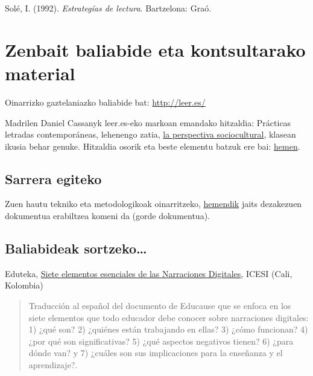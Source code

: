 \documentclass[
]{book}
\begin{document}
Solé, I. (1992). \emph{Estrategías de lectura}. Bartzelona: Graó.

\hypertarget{zenbait-baliabide-eta-kontsultarako-material}{%
\chapter*{Zenbait baliabide eta kontsultarako material}\label{zenbait-baliabide-eta-kontsultarako-material}}

Oinarrizko gaztelaniazko baliabide bat: \url{http://leer.es/}

Madrilen Daniel Cassanyk leer.es-eko markoan emandako hitzaldia: Prácticas letradas contemporáneas, lehenengo zatia, \href{https://www.youtube.com/embed/lsHc3SWiWEQ}{la perspectiva sociocultural}, klasean ikusia behar genuke. Hitzaldia osorik eta beste elementu batzuk ere bai: \href{http://www.youtube.com/watch?v=lsHc3SWiWEQ\&list=PLB91A13AEFDB0D9B0\&index=3}{hemen}.

\hypertarget{sarrera-egiteko}{%
\section{Sarrera egiteko}\label{sarrera-egiteko}}

Zuen hautu tekniko eta metodologikoak oinarritzeko, \href{https://github.com/JuanAbasolo/HD/raw/03-gaia/05_hizkuntzen_irakaskuntzarako_metodoak.pdf}{hemendik} jaits dezakezuen dokumentua erabiltzea komeni da (gorde dokumentua).

\hypertarget{baliabideak-sortzeko}{%
\section{Baliabideak sortzeko\ldots{}}\label{baliabideak-sortzeko}}

Eduteka, \href{http://eduteka.icesi.edu.co/articulos/NarracionesDigitales_Educause}{Siete elementos esenciales de las Narraciones Digitales}, ICESI (Cali, Kolombia)

\begin{quote}
Traducción al español del documento de Educause que se enfoca en los
siete elementos que todo educador debe conocer sobre narraciones
digitales: 1) ¿qué son? 2) ¿quiénes están trabajando en ellas? 3) ¿cómo
funcionan? 4) ¿por qué son significativas? 5) ¿qué aspectos negativos
tienen? 6) ¿para dónde van? y 7) ¿cuáles son sus implicaciones para la
enseñanza y el aprendizaje?.
\end{quote}
\end{document}
